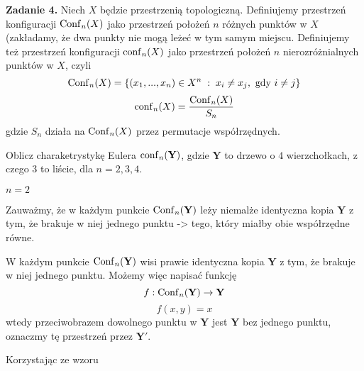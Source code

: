 \textbf{\large\color{orange}Zadanie 4.} Niech $X$ będzie przestrzenią topologiczną. Definiujemy przestrzeń konfiguracji $\operatorname{Conf}_n(X)$ jako przestrzeń położeń $n$ różnych punktów w $X$ (zakładamy, że dwa punkty nie mogą leżeć w tym samym miejscu. Definiujemy też przestrzeń konfiguracji $\operatorname{conf}_n(X)$ jako przestrzeń położeń $n$ nierozróżnialnych punktów w $X$, czyli
$$\operatorname{Conf}_n(X)=\{(x_1,...,x_n)\in X^n\;:\;x_i\neq x_j, \text{ gdy }i\neq j\}$$
$$\operatorname{conf}_n(X)=\frac{\operatorname{Conf}_n(X)}{S_n}$$
gdzie $S_n$ działa na $\operatorname{Conf}_n(X)$ przez permutacje współrzędnych.

Oblicz charaketrystykę Eulera $\operatorname{conf}_n(\mathbf{Y})$, gdzie $\mathbf{Y}$ to drzewo o $4$ wierzchołkach, z czego $3$ to liście, dla $n=2,3,4$.

\dotfill

\textbf{$n=2$}

Zauważmy, że w każdym punkcie $\operatorname{Conf}_n(\mathbf{Y})$ leży niemalże identyczna kopia $\mathbf{Y}$ z tym, że brakuje w niej jednego punktu -> tego, który miałby obie współrzędne równe.

W każdym punkcie $\operatorname{Conf}_n(\mathbf{Y})$ wisi prawie identyczna kopia $\mathbf{Y}$ z tym, że brakuje w niej jednego punktu. Możemy więc napisać funkcję
$$f:\operatorname{Conf}_n(\mathbf{Y})\to \mathbf{Y}$$
$$f(x, y)=x$$
wtedy przeciwobrazem dowolnego punktu w $\mathbf{Y}$ jest $\mathbf{Y}$ bez jednego punktu, oznaczmy tę przestrzeń przez $\mathbf{Y}'$.

Korzystając ze wzoru
